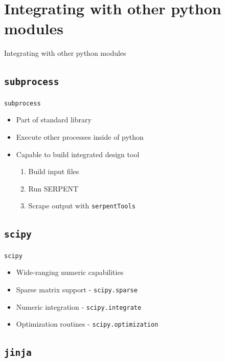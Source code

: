 \documentclass{beamer}
\newcommand{\st}{\texttt{serpentTools} }
\begin{document}
\section{Integrating with other python modules}

\begin{frame}{Integrating with other python modules}
        \tableofcontents[sectionstyle=show/hide,subsectionstyle=show/show/hide]
\end{frame}

\subsection{\texttt{subprocess}}

\begin{frame}{\texttt{subprocess}}
    \begin{itemize}
        \item{Part of standard library}
        \item{Execute other processes inside of python}
        \item{Capable to build integrated design tool}
        \begin{enumerate}
            \item{Build input files}
            \item{Run SERPENT}
            \item{Scrape output with \st}
        \end{enumerate}
    \end{itemize}
\end{frame}

\subsection{\texttt{scipy}}

\begin{frame}{\texttt{scipy}}
    \begin{itemize}
        \item{Wide-ranging numeric capabilities}
        \item{Sparse matrix support - \texttt{scipy.sparse}}
        \item{Numeric integration - \texttt{scipy.integrate}}
        \item{Optimization routines - \texttt{scipy.optimization}}
    \end{itemize}
\end{frame}

\subsection{\texttt{jinja}}
\end{document}
